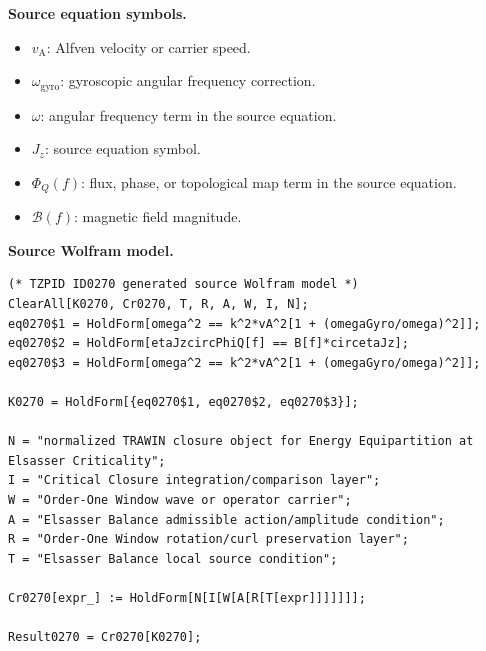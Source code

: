 \begin{minipage}[t]{0.49\linewidth}
\begingroup
\small
\raggedright
\textbf{Source equation symbols.}\par
\begin{itemize}[leftmargin=1.35em,itemsep=1pt,topsep=1pt,parsep=0pt]
    \item $v_{\mathrm{A}}$: Alfven velocity or carrier speed.
    \item $\omega_{\mathrm{gyro}}$: gyroscopic angular frequency correction.
    \item $\omega$: angular frequency term in the source equation.
    \item $J_z$: source equation symbol.
    \item $\Phi_Q(f)$: flux, phase, or topological map term in the source equation.
    \item $\mathcal{B}(f)$: magnetic field magnitude.
\end{itemize}
\endgroup
\end{minipage}\hfill
\begin{minipage}[t]{0.47\linewidth}
\begingroup
\scriptsize
\raggedright
\textbf{Source Wolfram model.}\par
\begin{Verbatim}[fontsize=\tiny,breaklines=true,breakanywhere=true]
(* TZPID ID0270 generated source Wolfram model *)
ClearAll[K0270, Cr0270, T, R, A, W, I, N];
eq0270$1 = HoldForm[omega^2 == k^2*vA^2[1 + (omegaGyro/omega)^2]];
eq0270$2 = HoldForm[etaJzcircPhiQ[f] == B[f]*circetaJz];
eq0270$3 = HoldForm[omega^2 == k^2*vA^2[1 + (omegaGyro/omega)^2]];

K0270 = HoldForm[{eq0270$1, eq0270$2, eq0270$3}];

N = "normalized TRAWIN closure object for Energy Equipartition at Elsasser Criticality";
I = "Critical Closure integration/comparison layer";
W = "Order-One Window wave or operator carrier";
A = "Elsasser Balance admissible action/amplitude condition";
R = "Order-One Window rotation/curl preservation layer";
T = "Elsasser Balance local source condition";

Cr0270[expr_] := HoldForm[N[I[W[A[R[T[expr]]]]]]];

Result0270 = Cr0270[K0270];
\end{Verbatim}
\endgroup
\end{minipage}

